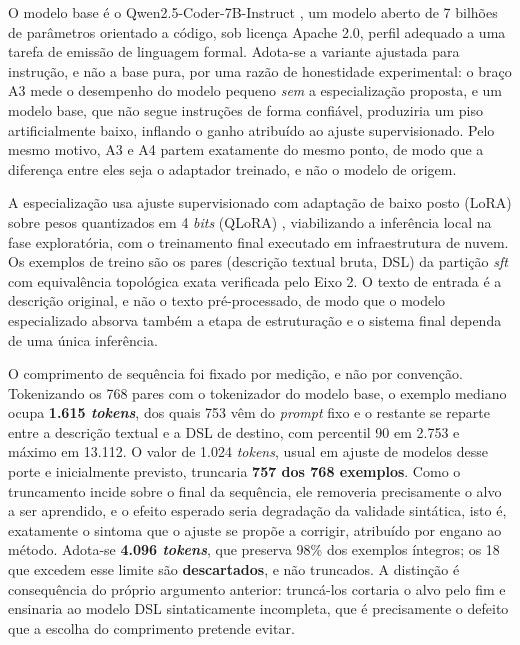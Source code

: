 O modelo base é o Qwen2.5-Coder-7B-Instruct \cite{hui2024qwen25coder}, um modelo aberto de 7 bilhões de parâmetros orientado a código, sob licença Apache 2.0, perfil adequado a uma tarefa de emissão de linguagem formal. Adota-se a variante ajustada para instrução, e não a base pura, por uma razão de honestidade experimental: o braço A3 mede o desempenho do modelo pequeno \textit{sem} a especialização proposta, e um modelo base, que não segue instruções de forma confiável, produziria um piso artificialmente baixo, inflando o ganho atribuído ao ajuste supervisionado. Pelo mesmo motivo, A3 e A4 partem exatamente do mesmo ponto, de modo que a diferença entre eles seja o adaptador treinado, e não o modelo de origem.

A especialização usa ajuste supervisionado com adaptação de baixo posto (LoRA) \cite{hu2022lora} sobre pesos quantizados em 4 \textit{bits} (QLoRA) \cite{dettmers2023qlora}, viabilizando a inferência local na fase exploratória, com o treinamento final executado em infraestrutura de nuvem. Os exemplos de treino são os pares (descrição textual bruta, DSL) da partição \textit{sft} com equivalência topológica exata verificada pelo Eixo 2. O texto de entrada é a descrição original, e não o texto pré-processado, de modo que o modelo especializado absorva também a etapa de estruturação e o sistema final dependa de uma única inferência.

O comprimento de sequência foi fixado por medição, e não por convenção. Tokenizando os 768 pares com o tokenizador do modelo base, o exemplo mediano ocupa \textbf{1.615 \textit{tokens}}, dos quais 753 vêm do \textit{prompt} fixo e o restante se reparte entre a descrição textual e a DSL de destino, com percentil 90 em 2.753 e máximo em 13.112. O valor de 1.024 \textit{tokens}, usual em ajuste de modelos desse porte e inicialmente previsto, truncaria \textbf{757 dos 768 exemplos}. Como o truncamento incide sobre o final da sequência, ele removeria precisamente o alvo a ser aprendido, e o efeito esperado seria degradação da validade sintática, isto é, exatamente o sintoma que o ajuste se propõe a corrigir, atribuído por engano ao método. Adota-se \textbf{4.096 \textit{tokens}}, que preserva 98\% dos exemplos íntegros; os 18 que excedem esse limite são \textbf{descartados}, e não truncados. A distinção é consequência do próprio argumento anterior: truncá-los cortaria o alvo pelo fim e ensinaria ao modelo DSL sintaticamente incompleta, que é precisamente o defeito que a escolha do comprimento pretende evitar.

